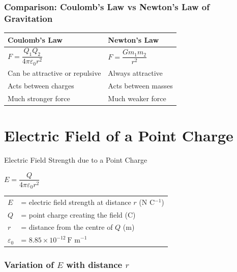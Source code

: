 \subsubsection*{Comparison: Coulomb's Law vs Newton's Law of Gravitation}

\begin{center}
\renewcommand{\arraystretch}{1.4}
\begin{tabular}{@{} p{5cm} p{5cm} @{}}
\toprule
\textbf{Coulomb's Law} & \textbf{Newton's Law} \\
\midrule
$F = \dfrac{Q_1 Q_2}{4\pi\varepsilon_0 r^2}$ & $F = \dfrac{Gm_1 m_2}{r^2}$ \\[0.5em]
Can be attractive or repulsive & Always attractive \\
Acts between charges & Acts between masses \\
Much stronger force & Much weaker force \\
\bottomrule
\end{tabular}
\end{center}

\section{Electric Field of a Point Charge}

\begin{formulabox}{Electric Field Strength due to a Point Charge}
\begin{center}
\Large $E = \dfrac{Q}{4\pi\varepsilon_0 r^2}$
\end{center}
\vspace{0.3em}
\begin{tabular}{@{}ll@{}}
$E$ & = electric field strength at distance $r$ (N C$^{-1}$) \\
$Q$ & = point charge creating the field (C) \\
$r$ & = distance from the centre of $Q$ (m) \\
$\varepsilon_0$ & = $8.85\times10^{-12}\ \text{F m}^{-1}$ \\
\end{tabular}
\end{formulabox}

\subsubsection*{Variation of $E$ with distance $r$}

\begin{center}
\end{center}

